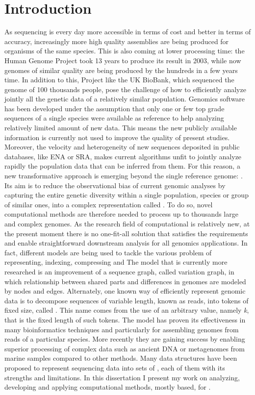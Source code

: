 \chapter{Introduction}
\label{sec:intro}

As sequencing is every day more accessible in terms of cost and better in terms of accuracy, increasingly more high quality assemblies are being produced for organisms of the same species. This is also coming at lower processing time: the Human Genome Project took 13 years to produce its result in 2003, while now genomes of similar quality are being produced by the hundreds in a few years time. In addition to this, Project like the UK BioBank, which sequenced the genome of 100 thousands people, pose the challenge of how to efficiently analyze jointly all the genetic data of a relatively similar population.
Genomics software has been developed under the assumption that only one or few top grade sequences of a single species were available as reference to help analyzing relatively limited amount of new data. This means the new publicly available information is currently not used to improve the quality of present studies. Moreover, the velocity and heterogeneity of new sequences deposited in public databases, like ENA or SRA, makes current algorithms unfit to jointly analyze rapidly the population data that can be inferred from them. 
For this reason, a new transformative approach is emerging beyond the single reference genome: \pangenomics.
Its aim is to reduce the observational bias of current genomic analyses by capturing the entire genetic diversity within a single population, species or group of similar ones, into a complex representation called \pangenome.
To do so, novel computational methods are therefore needed to process up to thousands large and complex genomes. As the research field of computational \pangenomics is relatively new, at the present moment there is no one-fit-all solution that satisfies the requirements and enable straightforward downstream analysis for all genomics applications. In fact, different models are being used to tackle the various problem of representing, indexing, compressing and 
The model that is currently more researched is an improvement of a sequence graph, called variation graph, in which relationship between shared parts and differences in genomes are modeled by nodes and edges.
Alternately, one known way of efficiently represent genomic data is to decompose sequences of variable length, known as reads, into tokens of fixed size, called \kmers. This name comes from the use of an arbitrary value, namely \emph{k}, that is the fixed length of such tokens. The \kmer model has proven its effectiveness in many bioinformatics techniques and particularly for assembling genomes from reads of a particular species. More recently they are gaining success by enabling superior processing of complex data such as ancient DNA or metagenomes from marine samples compared to other methods. Many data structures have been proposed to represent sequencing data into sets of \kmers, each of them with its strengths and limitations.
In this dissertation I present my work on analyzing, developing and applying computational methods, mostly \kmer based, for \pangenomics. 


